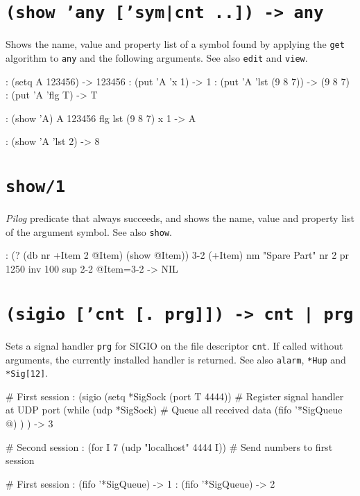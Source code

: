  
\section*{\texttt{(show 'any ['sym|cnt ..]) -> any}}
\label{sec:func-ref-S-(show 'any ['sym|cnt ..]) -> any}


Shows the name, value and property list of a symbol found by applying
the \texttt{get} algorithm to \texttt{any} and the following arguments. See also
\texttt{edit} and \texttt{view}.


\begin{wideverbatim}
: (setq A 123456)
-> 123456
: (put 'A 'x 1)
-> 1
: (put 'A 'lst (9 8 7))
-> (9 8 7)
: (put 'A 'flg T)
-> T

: (show 'A)
A 123456
   flg
   lst (9 8 7)
   x 1
-> A

: (show 'A 'lst 2)
-> 8
\end{wideverbatim}

 
\section*{\texttt{show/1}}
\label{sec:func-ref-S-show/1}


\emph{Pilog} predicate that always succeeds, and shows the
name, value and property list of the argument symbol. See also \texttt{show}.


\begin{wideverbatim}
: (? (db nr +Item 2 @Item) (show @Item))
{3-2} (+Item)
   nm "Spare Part"
   nr 2
   pr 1250
   inv 100
   sup {2-2}
 @Item={3-2}
-> NIL
\end{wideverbatim}

 
\section*{\texttt{(sigio ['cnt [. prg]]) -> cnt | prg}}
\label{sec:func-ref-S-(sigio ['cnt [. prg]]) -> cnt | prg}


Sets a signal handler \texttt{prg} for SIGIO on the file descriptor \texttt{cnt}. If
called without arguments, the currently installed handler is returned.
See also \texttt{alarm}, \texttt{*Hup} and \texttt{*Sig[12]}.


\begin{wideverbatim}
# First session
: (sigio (setq *SigSock (port T 4444))  # Register signal handler at UDP port
   (while (udp *SigSock)                # Queue all received data
      (fifo '*SigQueue @) ) )
-> 3

# Second session
: (for I 7 (udp "localhost" 4444 I))  # Send numbers to first session

# First session
: (fifo '*SigQueue)
-> 1
: (fifo '*SigQueue)
-> 2
\end{wideverbatim}


